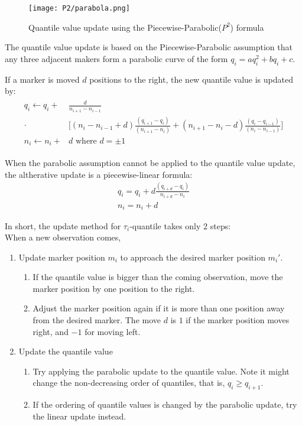 \begin{figure*}[h!]
	\texttt{[image: P2/parabola.png]}
    \caption{Quantile value update using the Piecewise-Parabolic($P^2$) formula}
    \label{fig: {multi_parabolic_p2}}
\end{figure*}

The quantile value update is based on the Piecewise-Parabolic assumption that any three adjacent makers form a parabolic curve of the form $q_i = aq_i^2 + bq_i + c$.

If a marker is moved $d$ positions to the right, the new quantile value is updated by:
\begin{align}
\begin{split}
    q_{i} \leftarrow q_{i}+ & \frac{d}{n_{i+1}-n_{i-1}}\\
    \cdot & { \bigg[ 
        \left(n_{i}-n_{i-1}+d\right) \frac{\left(q_{i+1}-q_{i}\right)}{\left(n_{i+1}-n_{i}\right)}
        +\left(n_{i+1}-n_{i}-d\right) \frac{\left(q_{i}-q_{i-1}\right)}{\left(n_{i}-n_{i-1}\right)}
        } \bigg] \\
    n_{i} \leftarrow n_{i}+&d \text{ where } d = \pm 1
\end{split}
\end{align}

When the parabolic assumption cannot be applied to the quantile value update, the altherative update is a piecewise-linear formula:
\begin{equation}
    \begin{array}{l}
    q_{i}=q_{i}+d \frac{\left(q_{i+d}-q_{i}\right)}{n_{i+d}-n_{i}} \\
    n_{i}=n_{i}+d
    \end{array}
\end{equation}

In short, the update method for $\tau_i$-quantile takes only 2 steps:\\
When a new observation comes,
\begin{enumerate}
    \item Update marker position $m_i$ to approach the desired marker position $m_i \prime$.
    \begin{enumerate}
        \item If the quantile value is bigger than the coming observation, move the marker position by one position to the right.
        \item Adjust the marker position again if it is more than one position away from the desired marker. The move $d$ is $1$ if the marker position moves right, and $-1$ for moving left.
    \end{enumerate}
    \item Update the quantile value
    \begin{enumerate}
        \item Try applying the parabolic update to the quantile value. Note it might change the non-decreasing order of quantiles, that is, $q_i \geq q_{i+1}$.
        \item If the ordering of quantile values is changed by the parabolic update, try the linear update instead.
    \end{enumerate}
\end{enumerate}


